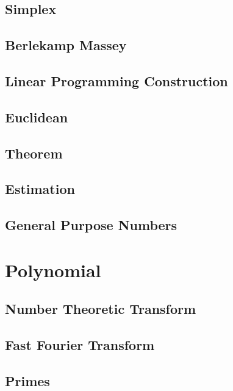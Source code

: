 \subsection{Simplex}
\subsection{Berlekamp Massey}
\subsection{Linear Programming Construction}

\subsection{Euclidean}

\subsection{Theorem}

\subsection{Estimation}

\subsection{General Purpose Numbers}

% 

\section{Polynomial}
\subsection{Number Theoretic Transform}

\subsection{Fast Fourier Transform}

\subsection{Primes}

